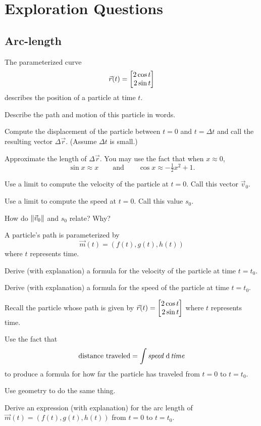\newpage
\section*{Exploration Questions}

\subsection*{Arc-length}
\begin{question}
	The parameterized curve
	\[
		\vec r(t) = \mat{2\cos t\\2\sin t}
	\]
	describes the position of a particle at time $t$.
	\begin{parts}
		\item Describe the path and motion of this particle in words.
		\item Compute the displacement  of the particle between $t=0$
			and $t=\Delta t$ and call the resulting vector $\Delta \vec r$.  
			(Assume $\Delta t$ is small.)
		\item Approximate the length of $\Delta \vec r$.  
			You may use the fact that
			when $x\approx 0$,
			\[
				\sin x\approx x\qquad\text{and}\qquad \cos x\approx -\tfrac{1}{2}x^2+1.
			\]
		\item Use a limit to compute the velocity of the particle at $t=0$. Call this 
			vector $\vec v_0$.
		\item Use a limit to compute the speed at $t=0$.  Call this value $s_0$.
		\item How do $\norm{\vec v_0}$ and $s_0$ relate?  Why?
	\end{parts}
\end{question}

\begin{question}
	A particle's path is parameterized by
	\[
		\vec m(t) = (f(t), g(t), h(t))
	\]
	where $t$ represents time.
	\begin{parts}
		\item Derive (with explanation) a formula for the velocity of
			the particle at time $t=t_0$.
		\item Derive (with explanation) a formula for the speed of
			the particle at time $t=t_0$.
	\end{parts}
\end{question}

\begin{question}
	Recall the particle whose path is given by
	$
		\vec r(t) = \mat{2\cos t\\2\sin t}
	$
	where $t$ represents time.
	\begin{parts}
		\item Use the fact that
			\[
				\text{distance traveled}=\int\text{\it speed}\ \mathrm{d}\,\text{\it time}
			\]
		to produce a formula for how far the particle has traveled from $t=0$ to $t=t_0$.
		\item Use geometry to do the same thing.
		\item Derive an expression (with explanation) for the arc length of $\vec m(t) = (f(t), g(t), h(t))$
			from $t=0$ to $t=t_0$.
	\end{parts}
\end{question}


